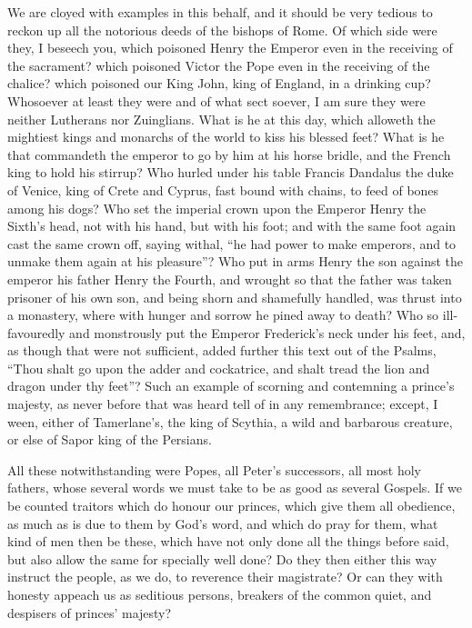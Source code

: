 We are cloyed with examples in this behalf, and it should be very
tedious to reckon up all the notorious deeds of the bishops of Rome.
Of which side were they, I beseech you, which poisoned Henry the Emperor
even in the receiving of the sacrament? which poisoned Victor the Pope
even in the receiving of the chalice? which poisoned our King John,
king of England, in a drinking cup? Whosoever at least they were
and of what sect soever, I am sure they were neither Lutherans nor Zuinglians.
What is he at this day, which alloweth the mightiest kings and monarchs
of the world to kiss his blessed feet? What is he that commandeth
the emperor to go by him at his horse bridle, and the French king to
hold his stirrup? Who hurled under his table Francis Dandalus
the duke of Venice, king of Crete and Cyprus, fast bound with chains,
to feed of bones among his dogs? Who set the imperial crown upon
the Emperor Henry the Sixth’s head, not with his hand, but with
his foot; and with the same foot again cast the same crown off, saying
withal, “he had power to make emperors, and to unmake them again
at his pleasure”? Who put in arms Henry the son against
the emperor his father Henry the Fourth, and wrought so that the
father was taken prisoner of his own son, and being shorn and shamefully
handled, was thrust into a monastery, where with hunger and sorrow he
pined away to death? Who so ill-favouredly and monstrously put
the Emperor Frederick’s neck under his feet, and, as though that
were not sufficient, added further this text out of the Psalms, “Thou
shalt go upon the adder and cockatrice, and shalt tread the lion and
dragon under thy feet”? Such an example of scorning and
contemning a prince’s majesty, as never before that was heard
tell of in any remembrance; except, I ween, either of Tamerlane’s,
the king of Scythia, a wild and barbarous creature, or else of Sapor
king of the Persians.

All these notwithstanding were Popes, all Peter’s successors,
all most holy fathers, whose several words we must take to be as good
as several Gospels. If we be counted traitors which do honour
our princes, which give them all obedience, as much as is due to them
by God’s word, and which do pray for them, what kind of men then
be these, which have not only done all the things before said, but also
allow the same for specially well done? Do they then either this
way instruct the people, as we do, to reverence their magistrate?
Or can they with honesty appeach
us as seditious persons, breakers of the common quiet, and despisers
of princes’ majesty?

